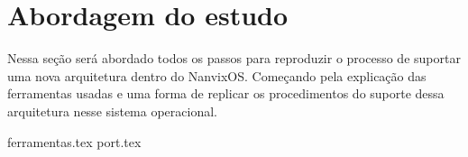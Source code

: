 \section{Abordagem do estudo}

Nessa seção será abordado todos os passos para reproduzir o processo de suportar uma nova arquitetura dentro do NanvixOS. Começando pela explicação das ferramentas usadas e uma forma de replicar os procedimentos do suporte dessa arquitetura nesse sistema operacional.

{ferramentas.tex}
{port.tex}